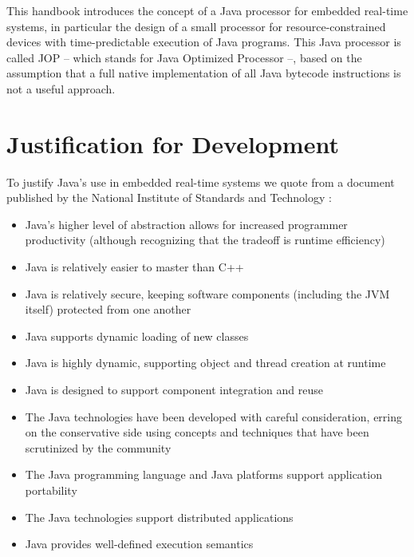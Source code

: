 

This handbook introduces the concept of a Java processor for
embedded real-time systems, in particular the design of a small
processor for resource-constrained devices with time-predictable
execution of Java programs. This Java processor is called JOP --
which stands for Java Optimized Processor --, based on the
assumption that a full native implementation of all Java bytecode
instructions is not a useful approach.

\section{Justification for Development}

To justify Java's use in embedded real-time systems we quote from a
document published by the National Institute of Standards and
Technology \cite{nist99}:

\begin{itemize}
    \item Java's higher level of abstraction allows for increased programmer
productivity (although recognizing that the tradeoff is runtime
efficiency)
    \item Java is relatively easier to master than C++
    \item Java is relatively secure, keeping software components (including
the JVM itself) protected from one another
    \item Java supports dynamic loading of new classes
    \item Java is highly dynamic, supporting object and thread creation at
runtime
    \item Java is designed to support component integration and reuse
    \item The Java technologies have been developed with careful
consideration, erring on the conservative side using concepts and
techniques that have been scrutinized by the community
    \item The Java programming language and Java platforms support
application portability
    \item The Java technologies support distributed applications
    \item Java provides well-defined execution semantics
\end{itemize}

